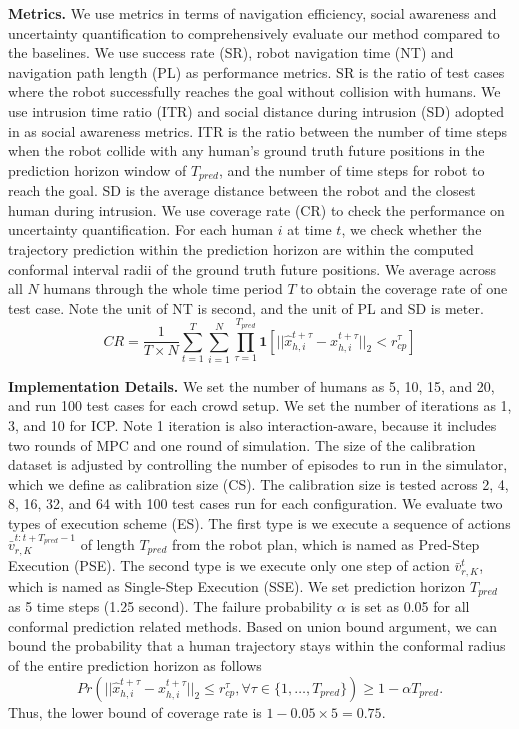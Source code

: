 \textbf{Metrics.} We use metrics in terms of navigation efficiency, social awareness and uncertainty quantification to comprehensively evaluate our method compared to the baselines. We use success rate (SR), robot navigation time (NT) and navigation path length (PL) as performance metrics. SR is the ratio of test cases where the robot successfully reaches the goal without collision with humans. We use intrusion time ratio (ITR) and social distance during intrusion (SD) adopted in \cite{liu2023intention} as social awareness metrics. ITR is the ratio between the number of time steps when the robot collide with any human's ground truth future positions in the prediction horizon window of $T_{pred}$, and the number of time steps for robot to reach the goal. SD is the average distance between the robot and the closest human during intrusion. We use coverage rate (CR) to check the performance on uncertainty quantification. For each human $i$ at time $t$, we check whether the trajectory prediction within the prediction horizon are within the computed conformal interval radii of the ground truth future positions. We average across all $N$ humans through the whole time period $T$ to obtain the coverage rate of one test case. Note the unit of NT is second, and the unit of PL and SD is meter.
\begin{equation}
    CR = \frac{1}{T \times N} \sum_{t=1}^{T} \sum_{i=1}^{N} \prod_{\tau=1}^{T_{pred}} \mathbf{1}[||\hat{x}_{h, i}^{t+\tau} - x_{h, i}^{t+\tau}||_2 < r_{cp}^{\tau}]
\end{equation}

\textbf{Implementation Details.} We set the number of humans as 5, 10, 15, and 20, and run 100 test cases for each crowd setup. We set the number of iterations as 1, 3, and 10 for ICP. Note 1 iteration is also interaction-aware, because it includes two rounds of MPC and one round of simulation. The size of the calibration dataset is adjusted by controlling the number of episodes to run in the simulator, which we define as calibration size (CS). The calibration size is tested across 2, 4, 8, 16, 32, and 64 with 100 test cases run for each configuration. We evaluate two types of execution scheme (ES). The first type is we execute a sequence of actions $\bar{v}_{r, K}^{t:t+T_{pred}-1}$ of length $T_{pred}$ from the robot plan, which is named as Pred-Step Execution (PSE). The second type is we execute only one step of action $\bar{v}_{r, K}^{t}$, which is named as Single-Step Execution (SSE). We set prediction horizon $T_{pred}$ as 5 time steps (1.25 second). The failure probability $\alpha$ is set as 0.05 for all conformal prediction related methods. Based on union bound argument, we can bound the probability that a human trajectory stays within the conformal radius of the entire prediction horizon as follows
\begin{equation}
    \label{eq:coverage}
    Pr\left(
        ||\hat{x}_{h,i}^{t+\tau}-x_{h,i}^{t+\tau}||_2 
        \leq
        r_{cp}^{\tau},
        \forall
        \tau \in \{1, \dots, T_{pred}\}
    \right) 
    \geq 1 - \alpha T_{pred}.
\end{equation}
Thus, the lower bound of coverage rate is $1-0.05\times 5 = 0.75$.

